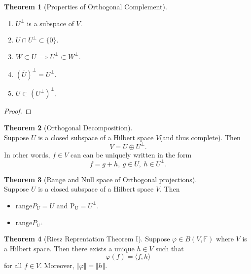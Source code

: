 \documentclass[12pt]{book}
\theoremstyle{definition}
\newtheorem{theorem}{Theorem}[chapter]
\newcommand{\inner}[2]{{\langle #1,#2\rangle}}
\newcommand{\F}{\mathbb{F}}
\begin{document}
\begin{theorem}[Properties of Orthogonal Complement] \
\begin{enumerate}
	\item $U^\perp$ is a subspace of $V$.
	\item $U \cap U^\perp \subset \{0\}$.
	\item $W \subset U \implies U^\perp \subset W^\perp$.
	\item $(\overline U)^\perp=U^\perp$.
	\item $U \subset (U^\perp)^\perp$.
\end{enumerate}
\end{theorem}
\begin{proof}

\end{proof}

\begin{theorem}[Orthogonal Decomposition] \ \\
Suppose $U$ is a closed subspace of a Hilbert space $V$(and thus complete). Then 
$$
V = U \oplus U^\perp.
$$
In other words, $f\in V$ can can be uniquely written in the form
$$
f = g + h, \ g \in U,\ h \in U^\perp. 
$$
\end{theorem}

\begin{theorem}[Range and Null space of Orthogonal projections] \ \\
Suppose $U$ is a closed subspace of a Hilbert space $V$. Then
\begin{itemize}
	\item $\mathrm{range}P_U=U$ and $\mathrm{P_U}=U^\perp$.
	\item $\mathrm{range}P_{U^\perp} $
\end{itemize}

\end{theorem}

\begin{theorem}[Riesz Reprentation Theorem I]\label{Riesz Reprentation Theorem}
Suppose $\varphi \in B(V,\F)$ where $V$ is a Hilbert space. Then there exists a unique $h \in V$ such that 
$$
\varphi(f) = \inner{f}{h}
$$
for all $f \in V$. Moreover, $\Vert \varphi \Vert = \Vert h \Vert$.
\end{theorem}
\end{document}
